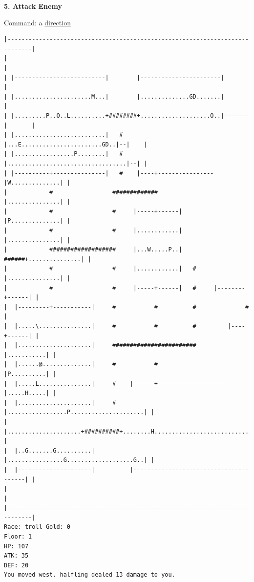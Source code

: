 \documentclass[11pt]{article}
\theoremstyle{plain}
\begin{document}
\newpage
\textbf{5. Attack Enemy}

Command: a \underline{direction}

\begin{Verbatim}[fontsize=\scriptsize]
|-----------------------------------------------------------------------------|
|                                                                             |
| |--------------------------|        |-----------------------|               |
| |......................M...|        |..............GD.......|               |
| |.........P..O..L..........+########+....................O..|-------|       |
| |..........................|   #    |...E.......................GD..|--|    |
| |.................P........|   #    |..................................|--| |
| |----------+---------------|   #    |----+----------------|W..............| |
|            #                 #############                |...............| |
|            #                 #     |-----+------|         |P..............| |
|            #                 #     |............|         |...............| |
|            ###################     |...W.....P..|   ######+...............| |
|            #                 #     |............|   #     |...............| |
|            #                 #     |-----+------|   #     |--------+------| |
|  |---------+-----------|     #           #          #              #        |
|  |.....\...............|     #           #          #         |----+------| |
|  |.....................|     ########################         |...........| |
|  |......@..............|     #           #                    |P..........| |
|  |.....L...............|     #    |------+--------------------|.....H.....| |
|  |.....................|     #    |.................P.....................| |
|  |.....................+##########+........H..............................| |
|  |..G.......G..........|          |................G...................G..| |
|  |---------------------|          |---------------------------------------| |
|                                                                             |
|-----------------------------------------------------------------------------|
Race: troll Gold: 0                                                    Floor: 1
HP: 107
ATK: 35
DEF: 20
You moved west. halfling dealed 13 damage to you. 
\end{Verbatim}
\end{document}
